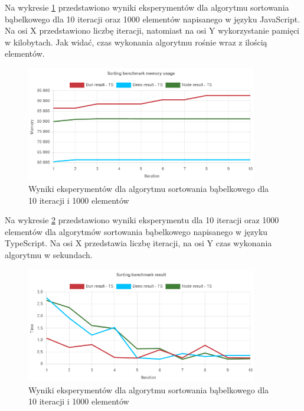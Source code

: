 Na wykresie \ref{fig:quick_sorting_e1_memory_js} przedstawiono wyniki eksperymentów dla algorytmu sortowania bąbelkowego dla 10 iteracji oraz 1000 elementów napisanego w języku JavaScript. Na osi X przedstawiono liczbę iteracji, natomiast na osi Y wykorzystanie pamięci w kilobytach. Jak widać, czas wykonania algorytmu rośnie wraz z ilością elementów.
\begin{figure}[H]
  \centering
  \includegraphics[width=0.9\textwidth]{Figures/sorting/quick/e1_memory_ts.png}
  \caption{Wyniki eksperymentów dla algorytmu sortowania bąbelkowego dla 10 iteracji i 1000 elementów}
  \label{fig:quick_sorting_e1_memory_js}
\end{figure}

Na wykresie \ref{fig:quick_sorting_e1_ts} przedstawiono wyniki eksperymentu dla 10 iteracji oraz 1000 elementów dla algorytmów sortowania bąbelkowego napisanego w języku TypeScript. Na osi X przedstawia liczbę iteracji, na osi Y czas wykonania algorytmu w sekundach.

\begin{figure}[H]
  \centering
  \includegraphics[width=0.9\textwidth]{Figures/sorting/quick/e1_ts.png}
  \caption{Wyniki eksperymentów dla algorytmu sortowania bąbelkowego dla 10 iteracji i 1000 elementów}
  \label{fig:quick_sorting_e1_ts}
\end{figure}

